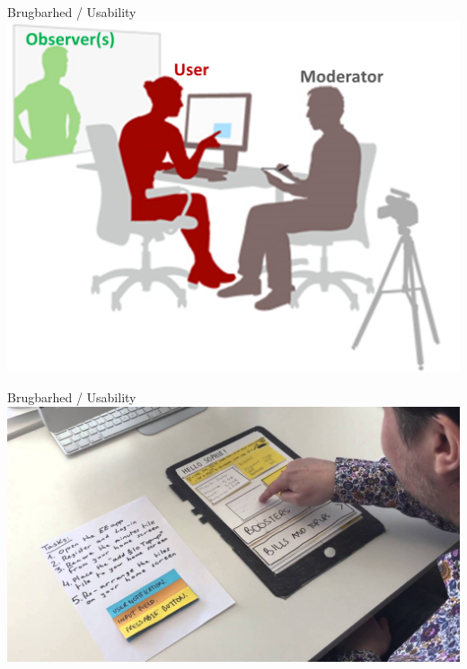 \documentclass[10pt]{beamer}
\begin{document}
\begin{frame}{Brugbarhed / Usability}
		\includegraphics[width=\linewidth]{img/observerusermoderator.png}
\end{frame}

\begin{frame}{Brugbarhed / Usability}
		\includegraphics[width=\linewidth]{img/tabletusability.jpg}
\end{frame}
\end{document}
